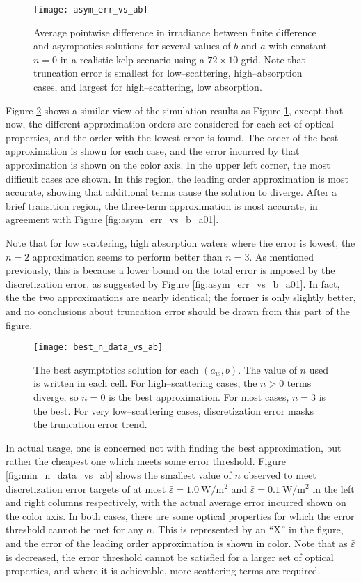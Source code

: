 \begin{figure}[h]
  \centering
  \texttt{[image: asym\_err\_vs\_ab]}
  \caption{Average pointwise difference in irradiance between finite difference and asymptotics solutions for several values of $b$ and $a$ with constant $n=0$ in a realistic kelp scenario using a $72\times 10$ grid. Note that truncation error is smallest for low--scattering, high--absorption cases, and largest for high--scattering, low absorption.}
  \label{fig:asym_err_vs_ab}
\end{figure}

Figure \ref{fig:best_n_data_vs_ab} shows a similar view of the simulation results as Figure \ref{fig:asym_err_vs_ab}, except that now, the different approximation orders are considered for each set of optical properties, and the order with the lowest error is found.
The order of the best approximation is shown for each case, and the error incurred by that approximation is shown on the color axis.
In the upper left corner, the most difficult cases are shown.
In this region, the leading order approximation is most accurate, showing that additional terms cause the solution to diverge.
After a brief transition region, the three-term approximation is most accurate, in agreement with Figure \ref{fig:asym_err_vs_b_a01}.

Note that for low scattering, high absorption waters where the error is lowest, the $n=2$ approximation seems to perform better than $n=3$.
As mentioned previously, this is because a lower bound on the total error is imposed by the discretization error, as suggested by Figure \ref{fig:asym_err_vs_b_a01}.
In fact, the the two approximations are nearly identical; the former is only slightly better, and no conclusions about truncation error should be drawn from this part of the figure.

\begin{figure}[h]
  \centering
  \texttt{[image: best\_n\_data\_vs\_ab]}
  \caption{The best asymptotics solution for each $(a_w,b)$. The value of $n$ used is written in each cell. For high--scattering cases, the $n>0$ terms diverge, so $n=0$ is the best approximation. For most cases, $n=3$ is the best. For very low--scattering cases, discretization error masks the truncation error trend.}
  \label{fig:best_n_data_vs_ab}
\end{figure}

In actual usage, one is concerned not with finding the best approximation, but rather the cheapest one which meets some error threshold.
Figure \ref{fig:min_n_data_vs_ab} shows the smallest value of $n$ observed to meet discretization error targets of at most $\bar{\varepsilon}=\SI{1.0}{\W\per\m\squared}$ and $\bar{\varepsilon}=\SI{0.1}{\W\per\m\squared}$ in the left and right columns respectively, with the actual average error incurred shown on the color axis.
In both cases, there are some optical properties for which the error threshold cannot be met for any $n$.
This is represented by an ``X'' in the figure, and the error of the leading order approximation is shown in color.
Note that as $\bar\varepsilon$ is decreased, the error threshold cannot be satisfied for a larger set of optical properties, and where it is achievable, more scattering terms are required.

